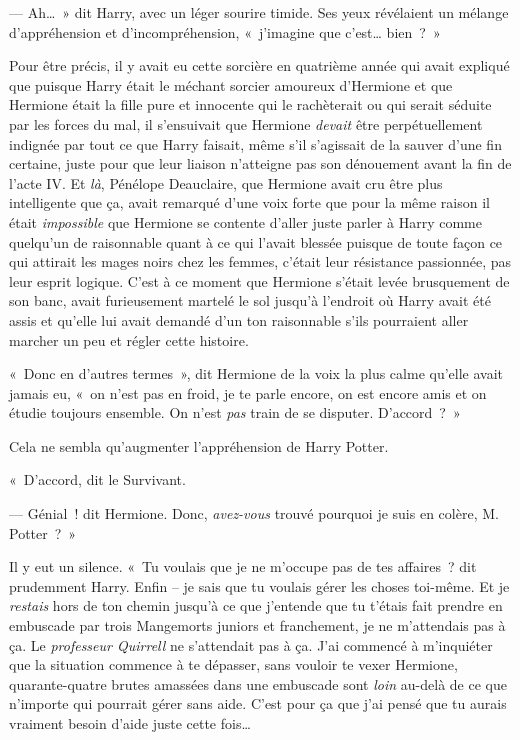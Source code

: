 --- Ah…~» dit Harry, avec un léger sourire timide. Ses yeux révélaient un mélange d'appréhension et d'incompréhension, «~j'imagine que c'est… bien~?~»

Pour être précis, il y avait eu cette sorcière en quatrième année qui avait expliqué que puisque Harry était le méchant sorcier amoureux d'Hermione et que Hermione était la fille pure et innocente qui le rachèterait ou qui serait séduite par les forces du mal, il s'ensuivait que Hermione \emph{devait} être perpétuellement indignée par tout ce que Harry faisait, même s'il s'agissait de la sauver d'une fin certaine, juste pour que leur liaison n'atteigne pas son dénouement avant la fin de l'acte IV. Et \emph{là}, Pénélope Deauclaire, que Hermione avait cru être plus intelligente que ça, avait remarqué d'une voix forte que pour la même raison il était \emph{impossible} que Hermione se contente d'aller juste parler à Harry comme quelqu'un de raisonnable quant à ce qui l'avait blessée puisque de toute façon ce qui attirait les mages noirs chez les femmes, c'était leur résistance passionnée, pas leur esprit logique. C'est à ce moment que Hermione s'était levée brusquement de son banc, avait furieusement martelé le sol jusqu'à l'endroit où Harry avait été assis et qu'elle lui avait demandé d'un ton raisonnable s'ils pourraient aller marcher un peu et régler cette histoire.

«~Donc en d'autres termes~», dit Hermione de la voix la plus calme qu'elle avait jamais eu, «~on n'est pas en froid, je te parle encore, on est encore amis et on étudie toujours ensemble. On n'est \emph{pas} train de se disputer. D'accord~?~»

Cela ne sembla qu'augmenter l'appréhension de Harry Potter.

«~D'accord, dit le Survivant.

--- Génial~! dit Hermione. Donc, \emph{avez-vous} trouvé pourquoi je suis en colère, M. Potter~?~»

Il y eut un silence. «~Tu voulais que je ne m'occupe pas de tes affaires~? dit prudemment Harry. Enfin -- je sais que tu voulais gérer les choses toi-même. Et je \emph{restais} hors de ton chemin jusqu'à ce que j'entende que tu t'étais fait prendre en embuscade par trois Mangemorts juniors et franchement, je ne m'attendais pas à ça. Le \emph{professeur Quirrell} ne s'attendait pas à ça. J'ai commencé à m'inquiéter que la situation commence à te dépasser, sans vouloir te vexer Hermione, quarante-quatre brutes amassées dans une embuscade sont \emph{loin} au-delà de ce que n'importe qui pourrait gérer sans aide. C'est pour ça que j'ai pensé que tu aurais vraiment besoin d'aide juste cette fois…

